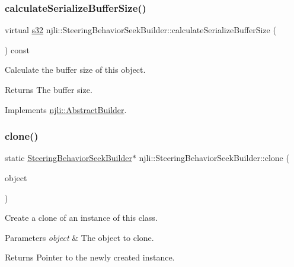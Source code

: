 \subsubsection{\texorpdfstring{calculate\+Serialize\+Buffer\+Size()}{calculateSerializeBufferSize()}}
{\footnotesize\ttfamily virtual \mbox{\hyperlink{_util_8h_aa62c75d314a0d1f37f79c4b73b2292e2}{s32}} njli\+::\+Steering\+Behavior\+Seek\+Builder\+::calculate\+Serialize\+Buffer\+Size (\begin{DoxyParamCaption}{ }\end{DoxyParamCaption}) const\hspace{0.3cm}{\ttfamily [virtual]}}

Calculate the buffer size of this object.

\begin{DoxyReturn}{Returns}
The buffer size. 
\end{DoxyReturn}


Implements \mbox{\hyperlink{classnjli_1_1_abstract_builder_aa1d220053e182c37b31b427499c6eacf}{njli\+::\+Abstract\+Builder}}.

\mbox{\label{classnjli_1_1_steering_behavior_seek_builder_ae08c8e0be2dd37e201a1b0a4414df8f0}} 
\subsubsection{\texorpdfstring{clone()}{clone()}}
{\footnotesize\ttfamily static \mbox{\hyperlink{classnjli_1_1_steering_behavior_seek_builder}{Steering\+Behavior\+Seek\+Builder}}$\ast$ njli\+::\+Steering\+Behavior\+Seek\+Builder\+::clone (\begin{DoxyParamCaption}\item[{const \mbox{\hyperlink{classnjli_1_1_steering_behavior_seek_builder}{Steering\+Behavior\+Seek\+Builder}} \&}]{object }\end{DoxyParamCaption})\hspace{0.3cm}{\ttfamily [static]}}

Create a clone of an instance of this class.


\begin{DoxyParams}{Parameters}
{\em object} & The object to clone.\\
\hline
\end{DoxyParams}
\begin{DoxyReturn}{Returns}
Pointer to the newly created instance. 
\end{DoxyReturn}
\mbox{\label{classnjli_1_1_steering_behavior_seek_builder_aaf0279e7ceda4c6356b1d7fc6fe19b51}} 
